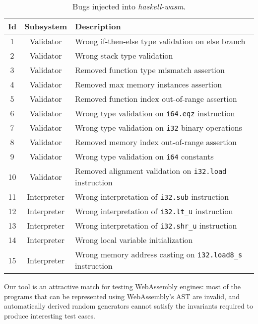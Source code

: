 \documentclass[sigconf,review,anonymous]{acmart}
\begin{document}
\begin{table}[b]
\scriptsize
\begin{tabular}{|c|c|l|}
\hline
\textbf{Id}
& \textbf{Subsystem}
& \textbf{Description} \\
\hline
1
& Validator
& Wrong if-then-else type validation on else branch \\
\hline
2
& Validator
& Wrong stack type validation \\
\hline
3
& Validator
& Removed function type mismatch assertion \\
\hline
4
& Validator
& Removed max memory instances assertion \\
\hline
5
& Validator
& Removed function index out-of-range assertion \\
\hline
6
& Validator
& Wrong type validation on \texttt{i64.eqz} instruction \\
\hline
7
& Validator
& Wrong type validation on \texttt{i32} binary operations \\
\hline
8
& Validator
& Removed memory index out-of-range assertion \\
\hline
9
& Validator
& Wrong type validation on \texttt{i64} constants \\
\hline
10
& Validator
& Removed alignment validation on \texttt{i32.load} instruction \\
\hline
11
& Interpreter
& Wrong interpretation of \texttt{i32.sub} instruction \\
\hline
12
& Interpreter
& Wrong interpretation of \texttt{i32.lt\_u} instruction \\
\hline
13
& Interpreter
& Wrong interpretation of \texttt{i32.shr\_u} instruction \\
\hline
14
& Interpreter
& Wrong local variable initialization \\
\hline
15
& Interpreter
& Wrong memory address casting on \texttt{i32.load8\_s} instruction \\
\hline
\end{tabular}
\caption{\label{table:wasm:injectedbugs}Bugs injected into
  \textit{haskell-wasm}.}
\vspace{-30pt}
\end{table}

Our tool is an attractive match for testing WebAssembly engines:
%
%
most of the programs that can be represented using WebAssembly's AST are
invalid, and automatically derived random generators cannot satisfy the
invariants required to produce interesting test cases.
\end{document}
